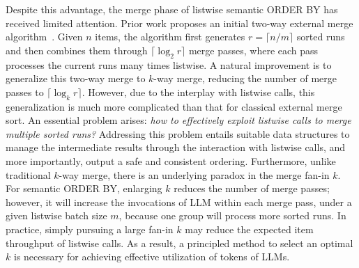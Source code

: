 Despite this advantage, the merge phase of listwise semantic \textsf{ORDER BY} has received limited attention. 
Prior work proposes an initial two-way external merge algorithm~\cite{DBLP:journals/corr/abs-2509-00303}. Given $n$ items, the algorithm first generates $r = \lceil n/m \rceil$ sorted runs and then combines them through  $ \lceil \log_2 r \rceil$ merge passes, where each pass processes the current runs many times listwise. 
A natural improvement is to generalize this two-way merge to $k$-way merge, reducing the number of merge passes to $ \lceil \log_k r \rceil$. However, due to the interplay with listwise calls, this generalization is much more complicated than that for classical external merge sort. 
An essential problem arises: \emph{how to effectively exploit listwise calls to merge multiple sorted runs?} 
Addressing this problem entails suitable data structures to manage the intermediate results through the interaction with listwise calls, and more importantly, output a safe and consistent ordering. 
Furthermore, unlike traditional $k$-way merge, there is an underlying paradox in the merge fan-in $k$. For semantic \textsf{ORDER BY}, enlarging $k$ reduces the number of merge passes; however, it will increase the invocations of LLM within each merge pass, under a given listwise batch size $m$, because one group will process more sorted runs.
In practice, simply pursuing a large fan-in $k$ may reduce the expected item throughput of listwise calls. As a result, a principled method to select an optimal $k$ is necessary for achieving effective utilization of tokens of LLMs. 

